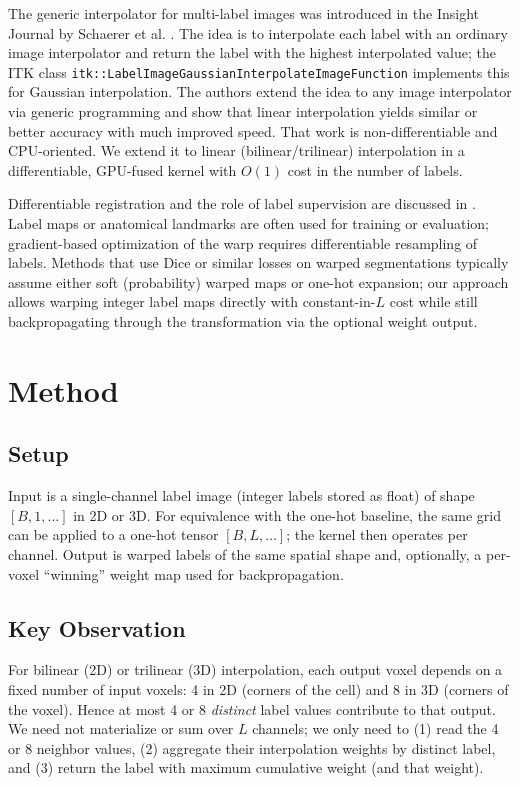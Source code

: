 \documentclass[11pt]{article}
\begin{document}
The generic interpolator for multi-label images was introduced in the Insight Journal by Schaerer et al. \cite{schaerer2014generic}. The idea is to interpolate each label with an ordinary image interpolator and return the label with the highest interpolated value; the ITK class \texttt{itk::LabelImageGaussianInterpolateImageFunction} implements this for Gaussian interpolation. The authors extend the idea to any image interpolator via generic programming and show that linear interpolation yields similar or better accuracy with much improved speed. That work is non-differentiable and CPU-oriented. We extend it to linear (bilinear/trilinear) interpolation in a differentiable, GPU-fused kernel with $O(1)$ cost in the number of labels.

Differentiable registration and the role of label supervision are discussed in \cite{jena2024mirage,jena2025deep}. Label maps or anatomical landmarks are often used for training or evaluation; gradient-based optimization of the warp requires differentiable resampling of labels. Methods that use Dice or similar losses on warped segmentations typically assume either soft (probability) warped maps or one-hot expansion; our approach allows warping integer label maps directly with constant-in-$L$ cost while still backpropagating through the transformation via the optional weight output.

\section{Method}
\label{sec:method}

\subsection{Setup}
Input is a single-channel label image (integer labels stored as float) of shape $[B, 1, \ldots]$ in 2D or 3D. For equivalence with the one-hot baseline, the same grid can be applied to a one-hot tensor $[B, L, \ldots]$; the kernel then operates per channel. Output is warped labels of the same spatial shape and, optionally, a per-voxel ``winning'' weight map used for backpropagation.

\subsection{Key Observation}
For bilinear (2D) or trilinear (3D) interpolation, each output voxel depends on a fixed number of input voxels: 4 in 2D (corners of the cell) and 8 in 3D (corners of the voxel). Hence at most 4 or 8 \emph{distinct} label values contribute to that output. We need not materialize or sum over $L$ channels; we only need to (1) read the 4 or 8 neighbor values, (2) aggregate their interpolation weights by distinct label, and (3) return the label with maximum cumulative weight (and that weight).
\end{document}

